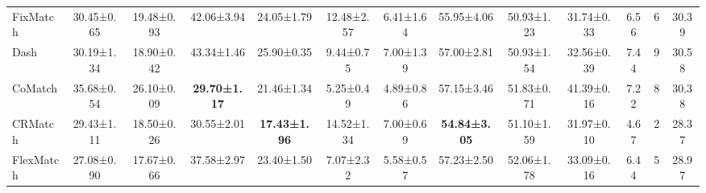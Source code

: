 \documentclass{article}
\begin{document}
\begin{table}[t!]
{\begin{tabular}{l|cc|cc|cc|cc|c|c|c|c}
FixMatch         & 30.45\tiny{±0.65}                        & 19.48\tiny{±0.93}                        & 42.06\tiny{±3.94}                    & 24.05\tiny{±1.79}                     & 12.48\tiny{±2.57}                      & 6.41\tiny{±1.64}                       & 55.95\tiny{±4.06}                          & 50.93\tiny{±1.23}                           & 31.74\tiny{±0.33}                           & 6.56                              & 6                              & 30.39                               \\
Dash             & 30.19\tiny{±1.34}                        & 18.90\tiny{±0.42}                        & 43.34\tiny{±1.46}                    & 25.90\tiny{±0.35}                     & 9.44\tiny{±0.75}                       & 7.00\tiny{±1.39}                       & 57.00\tiny{±2.81}                          & 50.93\tiny{±1.54}                           & 32.56\tiny{±0.39}                           & 7.44                              & 9                              & 30.58                               \\
CoMatch          & 35.68\tiny{±0.54}                        & 26.10\tiny{±0.09}                        & \textbf{29.70\tiny{±1.17}}           & 21.46\tiny{±1.34}                     & 5.25\tiny{±0.49}                       & 4.89\tiny{±0.86}                       & 57.15\tiny{±3.46}                          & 51.83\tiny{±0.71}                           & 41.39\tiny{±0.16}                           & 7.22                              & 8                              & 30.38                               \\
CRMatch          & 29.43\tiny{±1.11}                        & 18.50\tiny{±0.26}                        & 30.55\tiny{±2.01}                    & \textbf{17.43\tiny{±1.96}}            & 14.52\tiny{±1.34}                      & 7.00\tiny{±0.69}                       & \textbf{54.84\tiny{±3.05}}                 & 51.10\tiny{±1.59}                           & 31.97\tiny{±0.10}                           & 4.67                              & 2                              & 28.37                               \\
FlexMatch        & 27.08\tiny{±0.90}                        & 17.67\tiny{±0.66}                        & 37.58\tiny{±2.97}                    & 23.40\tiny{±1.50}                     & 7.07\tiny{±2.32}                       & 5.58\tiny{±0.57}                       & 57.23\tiny{±2.50}                          & 52.06\tiny{±1.78}                           & 33.09\tiny{±0.16}                           & 6.44                              & 5                              & 28.97                               \\

\end{tabular}}
\end{table}
\end{document}
